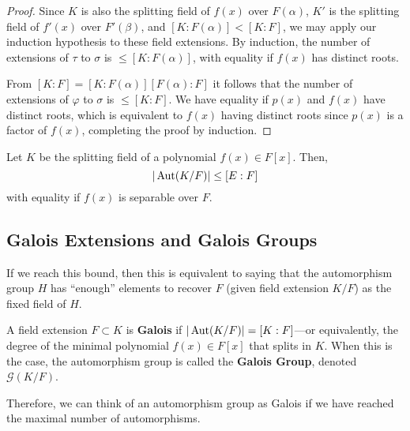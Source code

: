\begin{proof}
    Since $K$ is also the splitting field of $f(x)$ over $F(\alpha)$, $K'$ is the splitting field of $f'(x)$ over $F'(\beta)$, and $[K : F(\alpha)] < [K : F]$, we may apply our induction hypothesis to these field extensions. By induction, the number of extensions of $\tau$ to $\sigma$ is $\leq [K : F(\alpha)]$, with equality if $f(x)$ has distinct roots.

    From $[K : F] = [K : F(\alpha)][F(\alpha) : F]$ it follows that the number of extensions of $\varphi$ to $\sigma$ is $\leq [K : F]$. We have equality if $p(x)$ and $f(x)$ have distinct roots, which is equivalent to $f(x)$ having distinct roots since $p(x)$ is a factor of $f(x)$, completing the proof by induction. 
  \end{proof}

  \begin{corollary}
    Let $K$ be the splitting field of a polynomial $f(x) \in F[x]$. Then, 
    \begin{equation}
      | \Aut(K/F) | \leq [E:F]
    \end{equation}
    with equality if $f(x)$ is separable over $F$. 
  \end{corollary}

\subsection{Galois Extensions and Galois Groups}

  If we reach this bound, then this is equivalent to saying that the automorphism group $H$ has ``enough'' elements to recover $F$ (given field extension $K/F$) as the fixed field of $H$. 

  \begin{definition}
    A field extension $F \subset K$ is \textbf{Galois} if $|\Aut(K/F)| = [K:F]$---or equivalently, the degree of the minimal polynomial $f(x) \in F[x]$ that splits in $K$. When this is the case, the automorphism group is called the \textbf{Galois Group}, denoted $\mathcal{G}(K/F)$. 
  \end{definition}

  Therefore, we can think of an automorphism group as Galois if we have reached the maximal number of automorphisms. 

